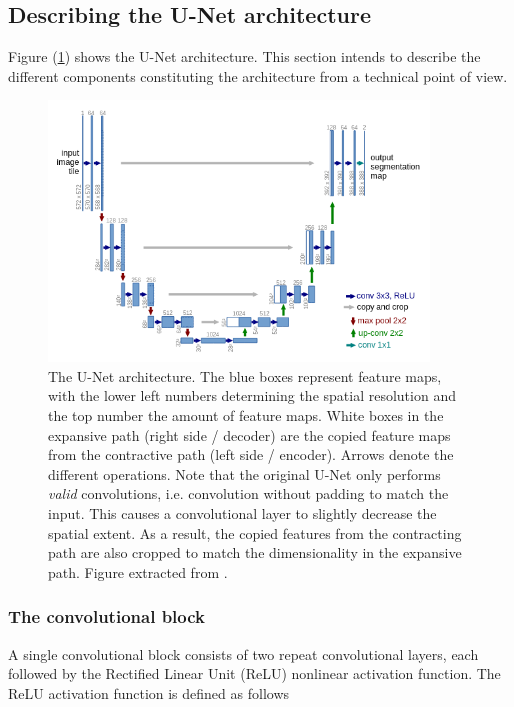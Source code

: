 \documentclass[../main/thesis.tex]{subfiles}
\begin{document}
\subsection{Describing the U-Net architecture}
\label{sec:unet}
Figure (\ref{fig:unet-overview}) shows the U-Net architecture. This section intends to describe the different components constituting the architecture from a technical point of view. 

\begin{figure}
    \centering
    \includegraphics[width=0.9\textwidth]{unet_screenshot}
    \caption{\label{fig:unet-overview}The U-Net architecture. The blue boxes represent feature maps, with the lower left numbers determining the spatial resolution and the top number the amount of feature maps. White boxes in the expansive path (right side / decoder) are the copied feature maps from the contractive path (left side / encoder). Arrows denote the different operations. Note that the original U-Net only performs \textit{valid} convolutions, i.e. convolution without padding to match the input. This causes a convolutional layer to slightly decrease the spatial extent. As a result, the copied features from the contracting path are also cropped to match the dimensionality in the expansive path. Figure extracted from \protect\citet{Ronneberger2015}.}
\end{figure}

\subsubsection{The convolutional block}
A single convolutional block consists of two repeat convolutional layers, each followed by the Rectified Linear Unit (ReLU) \citep{Nair2010} nonlinear activation function. The ReLU activation function is defined as follows
\end{document}
